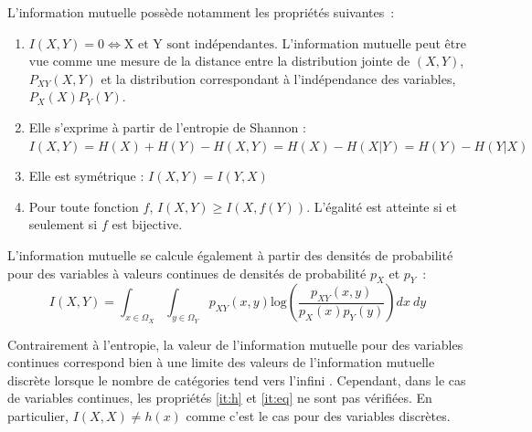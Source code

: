 \documentclass[../main]{subfiles}
\begin{document}
L'information mutuelle possède notamment les propriétés suivantes~:
\begin{enumerate}
\item $I(X,Y) = 0 \Leftrightarrow \textrm{X et Y sont indépendantes}$. L'information mutuelle peut être vue comme une mesure de la distance entre la distribution jointe de $(X,Y)$, $P_{XY}(X,Y)$ et la distribution correspondant à l'indépendance des variables, $P_X(X)P_Y(Y)$.
\item\label{it:h} Elle s'exprime à partir de l'entropie de Shannon : $I(X,Y) = H(X) + H(Y) - H(X,Y) = H(X) - H(X|Y) = H(Y) - H(Y|X)$
\item Elle est symétrique : $I(X,Y) = I(Y,X)$
\item\label{it:eq} Pour toute fonction $f$, $I(X,Y) \geq I(X,f(Y))$. L'égalité est atteinte si et seulement si $f$ est bijective.
\end{enumerate}

L'information mutuelle se calcule également à partir des densités de probabilité pour des variables à valeurs continues de densités de probabilité $p_X$ et $p_Y$~:
\begin{equation}
    I(X,Y) = \int_{x \in \Omega_X}\int_{y \in \Omega_Y }{p_{XY}(x,y)\textrm{log}(\frac{p_{XY}(x,y)}{p_X(x)p_Y(y)})dx \: dy}
\end{equation}

Contrairement à l'entropie, la valeur de l'information mutuelle pour des variables continues correspond bien à une limite des valeurs de l'information mutuelle discrète lorsque le nombre de catégories tend vers l'infini \parencite{Cover2005ElementsOI}.
Cependant, dans le cas de variables continues, les propriétés \ref{it:h} et \ref{it:eq} ne sont pas vérifiées. 
En particulier, $I(X,X) \neq h(x)$ comme c'est le cas pour des variables discrètes.
\end{document}
